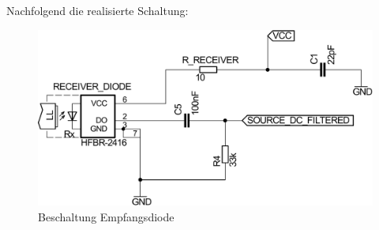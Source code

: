 \noindent
\newpage
Nachfolgend die realisierte Schaltung:
\begin{figure}[htbp]
\centering
 \includegraphics[scale=0.45]{gfx/receiver_part.pdf}
	\caption{Beschaltung Empfangsdiode}
\end{figure}
 
 

